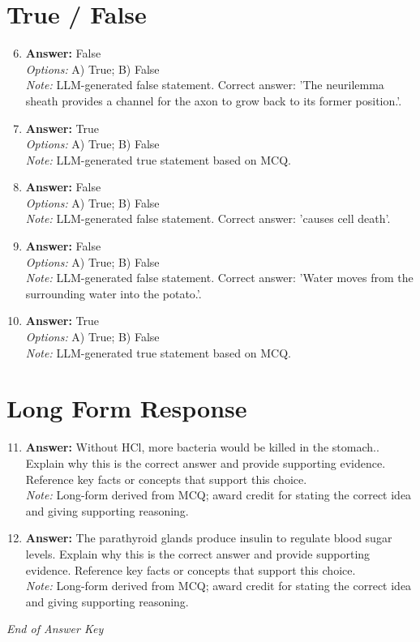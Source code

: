 \documentclass[12pt]{article}
\begin{document}
\section*{True / False}
\begin{enumerate}[label=\arabic*.]
\setcounter{enumi}{5}
\item \textbf{Answer:} False
\\ \textit{Options:} A) True; B) False
\\ \textit{Note:} LLM-generated false statement. Correct answer: 'The neurilemma sheath provides a channel for the axon to grow back to its former position.'.
\item \textbf{Answer:} True
\\ \textit{Options:} A) True; B) False
\\ \textit{Note:} LLM-generated true statement based on MCQ.
\item \textbf{Answer:} False
\\ \textit{Options:} A) True; B) False
\\ \textit{Note:} LLM-generated false statement. Correct answer: 'causes cell death'.
\item \textbf{Answer:} False
\\ \textit{Options:} A) True; B) False
\\ \textit{Note:} LLM-generated false statement. Correct answer: 'Water moves from the surrounding water into the potato.'.
\item \textbf{Answer:} True
\\ \textit{Options:} A) True; B) False
\\ \textit{Note:} LLM-generated true statement based on MCQ.
\end{enumerate}

\section*{Long Form Response}
\begin{enumerate}[label=\arabic*.]
\setcounter{enumi}{10}
\item \textbf{Answer:} Without HCl, more bacteria would be killed in the stomach.. Explain why this is the correct answer and provide supporting evidence. Reference key facts or concepts that support this choice.
\\ \textit{Note:} Long-form derived from MCQ; award credit for stating the correct idea and giving supporting reasoning.
\item \textbf{Answer:} The parathyroid glands produce insulin to regulate blood sugar levels. Explain why this is the correct answer and provide supporting evidence. Reference key facts or concepts that support this choice.
\\ \textit{Note:} Long-form derived from MCQ; award credit for stating the correct idea and giving supporting reasoning.
\end{enumerate}

\vfill
\noindent\textit{End of Answer Key}
\end{document}
